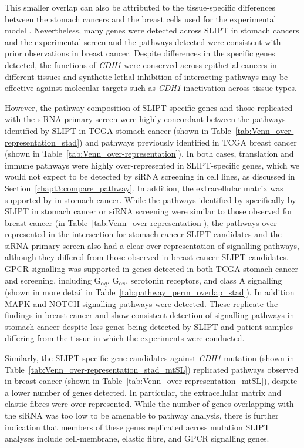 This smaller overlap can also be attributed to the tissue-specific differences between the stomach cancers and the breast cells used for the experimental model \citep{Chen2014}. Nevertheless, many genes were detected across \gls{SLIPT} in stomach cancers and the experimental screen \citep{Telford2015} and the pathways detected were consistent with prior observations in breast cancer. Despite differences in the specific genes detected, the functions of \textit{CDH1} were conserved across epithetial cancers in different tissues and \gls{synthetic lethal} inhibition of interacting pathways may be effective against molecular targets such as \textit{CDH1} inactivation across tissue types.

However, the pathway composition of \gls{SLIPT}-specific genes and those replicated with the \gls{siRNA} primary screen \citep{Telford2015} were highly concordant between the pathways identified by \gls{SLIPT} in \gls{TCGA} stomach cancer (shown in Table~\ref{tab:Venn_over-representation_stad}) and pathways previously identified in \gls{TCGA} breast cancer (shown in Table~\ref{tab:Venn_over-representation}). In both cases, translation and immune pathways were highly over-represented in \gls{SLIPT}-specific genes, which we would not expect to be detected by \gls{siRNA} screening in cell lines, as discussed in Section~\ref{chapt3:compare_pathway}. In addition, the extracellular matrix was supported by in stomach cancer. While the pathways identified by specifically by \gls{SLIPT} in stomach cancer or \gls{siRNA} screening were similar to those observed for breast cancer (in Table~\ref{tab:Venn_over-representation}), the pathways over-represented in the intersection for stomach cancer \gls{SLIPT} candidates and the \gls{siRNA} primary screen \citep{Telford2015} also had a clear over-representation of signalling pathways, although they differed from those observed in breast cancer \gls{SLIPT} candidates. \gls{GPCR} signalling was supported in genes detected in both \gls{TCGA} stomach cancer and screening, including G$_{\alpha q}$, G$_{\alpha s}$, serotonin receptors, and class A signalling (shown in more detail in Table~\ref{tab:pathway_perm_overlap_stad}). In addition MAPK and NOTCH signalling pathways were detected. These replicate the findings in breast cancer and show consistent detection of signalling pathways in stomach cancer despite less genes being detected by \gls{SLIPT} and patient samples differing from the tissue in which the experiments were conducted.

Similarly, the \gls{SLIPT}-specific gene candidates against \textit{CDH1} \gls{mutation} (shown in Table~\ref{tab:Venn_over-representation_stad_mtSL}) replicated pathways observed in breast cancer (shown in Table~\ref{tab:Venn_over-representation_mtSL}), despite a lower number of genes detected. In particular, the extracellular matrix and elastic fibres were over-represented. While the number of genes overlapping with the \gls{siRNA} was too low to be amenable to pathway analysis, there is further indication that members of these genes replicated across \gls{mutation} \gls{SLIPT} analyses include cell-membrane, elastic fibre, and \gls{GPCR} signalling genes. 

